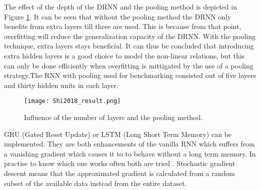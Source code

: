 The effect of the depth of the DRNN and the pooling method is depicted in Figure \ref{fig:Shi2018_result}. It can be seen that without the pooling method the DRNN only benefits from extra layers till three are used. This is because from that point, overfitting will reduce the generalization capacity of the DRNN. With the pooling technique, extra layers stays beneficial. It can thus be concluded that introducing extra hidden layers is a good choice to model the non-linear relations, but this can only be done efficiently when overfitting is mittigated by the use of a pooling strategy.The RNN with pooling used for benchmarking consisted out of five layers and thirty hidden units in each layer.

\begin{figure}[h!]
	\centering
	\texttt{[image: Shi2018\_result.png]}
	\caption{Influence of the number of layers and the pooling method.}
	\label{fig:Shi2018_result}
\end{figure}

GRU (Gated Reset Update) or LSTM (Long Short Term Memory) can be implemented. They are both enhancements of the vanilla RNN which suffers from a vanishing gradient which causes it to to behave without a long term memory. In practise to know which one works often both are tried \cite{Teuwen2019}. Stochastic gradient descent means that the approximated gradient is calculated from a random subset of the available data instead from the entire dataset. \\

